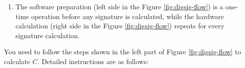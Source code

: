 \documentclass[main\_\_EN.tex]{subfiles}
\begin{document}
\begin{tiplisting}
\vspace{-2.5em}
\begin{enumerate}
\item The software preparation (left side in the Figure \ref{fig:digsig-flow}) is a one-time operation before any signature is calculated, while the hardware calculation (right side in the Figure \ref{fig:digsig-flow}) repeats for every signature calculation.
\end{enumerate}
\end{tiplisting}

You need to follow the steps shown in the left part of Figure \ref{fig:digsig-flow} to calculate \begin{math}C\end{math}. Detailed instructions are as follows:
\end{document}
